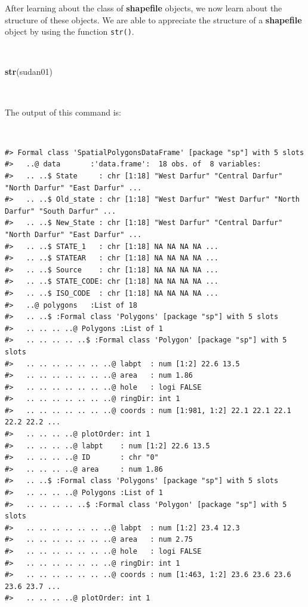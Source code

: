 \documentclass[12pt,a4paper,a4paper]{book}
\newenvironment{Shaded}{\begin{snugshade}}{\end{snugshade}}
\newcommand{\KeywordTok}[1]{\textcolor[rgb]{0.13,0.29,0.53}{\textbf{#1}}}
\newcommand{\NormalTok}[1]{#1}
\theoremstyle{definition}
\theoremstyle{definition}
\theoremstyle{definition}
\theoremstyle{remark}
\begin{document}
After learning about the class of \textbf{shapefile} objects, we now
learn about the structure of these objects. We are able to appreciate
the structure of a \textbf{shapefile} object by using the function
\texttt{str()}.

~

\begin{Shaded}
\begin{Highlighting}[]
\KeywordTok{str}\NormalTok{(sudan01)}
\end{Highlighting}
\end{Shaded}

~

The output of this command is:

~

\begin{verbatim}
#> Formal class 'SpatialPolygonsDataFrame' [package "sp"] with 5 slots
#>   ..@ data       :'data.frame':  18 obs. of  8 variables:
#>   .. ..$ State     : chr [1:18] "West Darfur" "Central Darfur" "North Darfur" "East Darfur" ...
#>   .. ..$ Old_state : chr [1:18] "West Darfur" "West Darfur" "North Darfur" "South Darfur" ...
#>   .. ..$ New_State : chr [1:18] "West Darfur" "Central Darfur" "North Darfur" "East Darfur" ...
#>   .. ..$ STATE_1   : chr [1:18] NA NA NA NA ...
#>   .. ..$ STATEAR   : chr [1:18] NA NA NA NA ...
#>   .. ..$ Source    : chr [1:18] NA NA NA NA ...
#>   .. ..$ STATE_CODE: chr [1:18] NA NA NA NA ...
#>   .. ..$ ISO_CODE  : chr [1:18] NA NA NA NA ...
#>   ..@ polygons   :List of 18
#>   .. ..$ :Formal class 'Polygons' [package "sp"] with 5 slots
#>   .. .. .. ..@ Polygons :List of 1
#>   .. .. .. .. ..$ :Formal class 'Polygon' [package "sp"] with 5 slots
#>   .. .. .. .. .. .. ..@ labpt  : num [1:2] 22.6 13.5
#>   .. .. .. .. .. .. ..@ area   : num 1.86
#>   .. .. .. .. .. .. ..@ hole   : logi FALSE
#>   .. .. .. .. .. .. ..@ ringDir: int 1
#>   .. .. .. .. .. .. ..@ coords : num [1:981, 1:2] 22.1 22.1 22.1 22.2 22.2 ...
#>   .. .. .. ..@ plotOrder: int 1
#>   .. .. .. ..@ labpt    : num [1:2] 22.6 13.5
#>   .. .. .. ..@ ID       : chr "0"
#>   .. .. .. ..@ area     : num 1.86
#>   .. ..$ :Formal class 'Polygons' [package "sp"] with 5 slots
#>   .. .. .. ..@ Polygons :List of 1
#>   .. .. .. .. ..$ :Formal class 'Polygon' [package "sp"] with 5 slots
#>   .. .. .. .. .. .. ..@ labpt  : num [1:2] 23.4 12.3
#>   .. .. .. .. .. .. ..@ area   : num 2.75
#>   .. .. .. .. .. .. ..@ hole   : logi FALSE
#>   .. .. .. .. .. .. ..@ ringDir: int 1
#>   .. .. .. .. .. .. ..@ coords : num [1:463, 1:2] 23.6 23.6 23.6 23.6 23.7 ...
#>   .. .. .. ..@ plotOrder: int 1

\end{verbatim}
\end{document}
